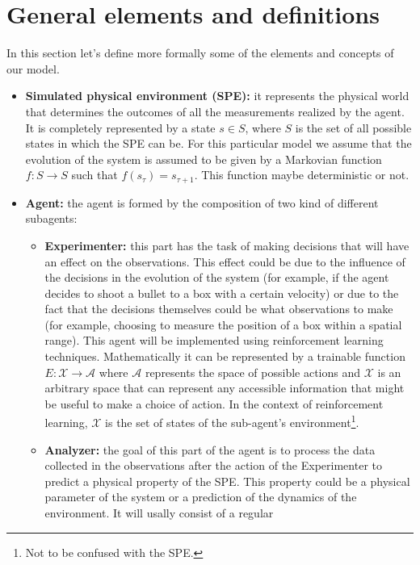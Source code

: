 \documentclass[11pt,a4paper,twoside]{report}
\newcommand{\+}{\textnormal{+} }
\theoremstyle{definition}
\numberwithin{equation}{chapter}
\begin{document}
\section{General elements and definitions}
In this section let's define more formally some of the elements and concepts of
our model.
\begin{itemize}
    \item \textbf{Simulated physical environment (SPE): } it represents the
    physical world that determines the outcomes of all the measurements realized
    by the agent. It is completely represented by a state $ s \in S $, where $S$
    is the set of all possible states in which the SPE can be. For this
    particular model we assume that the evolution of the system is assumed to be
    given by a Markovian function $f: S \rightarrow S$ such that
    $f(s_\tau)=s_{\tau+1}$. This function maybe deterministic or not.
    \item \textbf{Agent:} the agent is formed by the composition of two kind of
    different subagents:
    \begin{itemize}
        \item \textbf{Experimenter:} this part has the task of making decisions
        that will have an effect on the observations. This effect could be due
        to the influence of the decisions in the evolution of the system (for
        example, if the agent decides to shoot a bullet to a box with a certain
        velocity) or due to the fact that the decisions themselves could be what
        observations to make (for example, choosing to measure the position of a
        box within a spatial range). This agent will be implemented using
        reinforcement learning techniques. Mathematically it can be represented
        by a trainable function $E:\mathcal{X}\rightarrow\mathcal{A}$ where
        $\mathcal{A}$ represents the space of possible actions and $\mathcal{X}$
        is an arbitrary space that can represent any accessible information that
        might be useful to make a choice of action. In the context of
        reinforcement learning, $\mathcal{X}$ is the set of states of the
        sub-agent's environment\footnote{Not to be confused with the SPE.}.
        \item \textbf{Analyzer:} the goal of this part of the agent is to
        process the data collected in the observations after the action of the
        Experimenter to predict a physical property of the SPE. This property
        could be a physical parameter of the system or a prediction of the
        dynamics of the environment. It will usally consist of a regular

\end{itemize}
\end{itemize}
\end{document}
